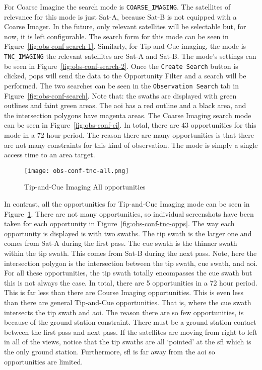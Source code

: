For Coarse Imagine the search mode is \texttt{COARSE\_IMAGING}.  The satellites
of relevance for this mode is just Sat-A, because Sat-B is not equipped with a
Coarse Imager. In the future, only relevant satellites will be selectable but,
for now, it is left configurable.  The search form for this mode can be seen in
Figure~\ref{fig:obs-conf-search-1}. Similarly, for Tip-and-Cue imaging, the
mode is \texttt{TNC\_IMAGING} the relevant satellites are Sat-A and Sat-B.  The
mode's settings can be seen in Figure~\ref{fig:obs-conf-search-2}. Once the
\texttt{Create Search} button is clicked, \gls{pops} will send the data to the
Opportunity Filter and a search will be performed. The two searches can be seen
in the \texttt{Observation Search} tab in Figure~\ref{fig:obs-conf-search}.
Note that: the swaths are displayed with green outlines and faint green areas.
The \gls{aoi} has a red outline and a black area, and the intersection polygons
have magenta areas. The Coarse Imaging search mode can be seen in
Figure~\ref{fig:obs-conf-ci}. In total, there are 43 opportunities for this
mode in a 72 hour period. The reason there are many opportunities is that there
are not many constraints for this kind of observation. The mode is simply a
single access time to an area target. 

\begin{figure}[h]
    \centering
    \texttt{[image: obs-conf-tnc-all.png]} 
    \caption{Tip-and-Cue Imaging All opportunities}
    \label{fig:obs-conf-tnc-all} 
\end{figure}

In contrast, all the opportunities for Tip-and-Cue Imaging mode can be seen in
Figure~\ref{fig:obs-conf-tnc-all}. There are not many opportunities, so
individual screenshots have been taken for each opportunity in
Figure~\ref{fig:obs-conf-tnc-opps}. The way each opportunity is displayed is
with two swaths.  The tip swath is the larger one and comes from Sat-A during
the first pass. The cue swath is the thinner swath within the tip swath. This
comes from Sat-B during the next pass. Note, here the intersection polygon is
the intersection between the tip swath, cue swath, and \gls{aoi}. For all these
opportunities, the tip swath totally encompasses the cue swath but this is not
always the case. In total, there are 5 opportunities in a 72 hour period. This
is far less than there are Course Imaging opportunities. This is even less than
there are general Tip-and-Cue opportunities. That is, where the cue swath
intersects the tip swath and \gls{aoi}. The reason there are so few
opportunities, is because of the ground station constraint. There must be a
ground station contact between the first pass and next pass. If the satellites
are moving from right to left in all of the views, notice that the tip swaths
are all `pointed' at the \gls{sfl} which is the only ground station.
Furthermore, \gls{sfl} is far away from the \gls{aoi} so opportunities are
limited.


